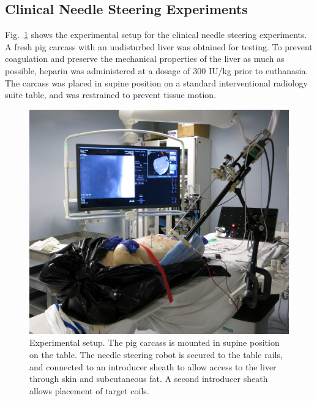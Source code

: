 \subsection{Clinical Needle Steering Experiments}
Fig.~\ref{fig:CadaverSetup} shows the experimental setup for the clinical needle steering experiments. A fresh pig carcass with an undisturbed liver was obtained for testing. To prevent coagulation and preserve the mechanical properties of the liver as much as possible, heparin was administered at a dosage of 300 IU/kg prior to euthanasia. The carcass was placed in supine position on a standard interventional radiology suite table, and was restrained to prevent tissue motion. 

\begin{figure}[!t]
\centering
\includegraphics[width = \columnwidth]{./Images/Chapter5/CadaverSetup/CadaverSetup.jpg}%
\caption[Experimental setup for clinical needle steering]{Experimental setup. The pig carcass is mounted in supine position on the table. The needle steering robot is secured to the table rails, and connected to an introducer sheath to allow access to the liver through skin and subcutaneous fat. A second introducer sheath allows placement of target coils.}
\label{fig:CadaverSetup}
\end{figure}  


